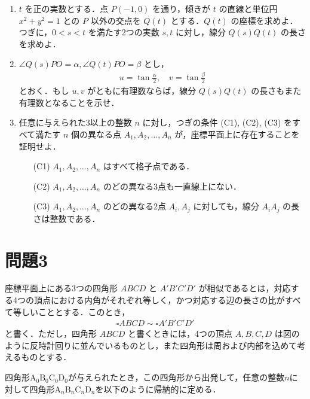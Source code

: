 \documentclass[unicode,12pt, A4j]{ltjsarticle}%
\begin{document}
\begin{enumerate}
 \item $t$ を正の実数とする．点 $P(-1, 0)$ を通り，傾きが $t$ の直線と単位円 $x^2 + y^2 = 1$ との $P$ 以外の交点を $Q(t)$ とする．$Q(t)$ の座標を求めよ．つぎに，$0 < s < t$ を満たす2つの実数 $s, t$ に対し，線分 $Q(s)Q(t)$ の長さを求めよ．
 \item $\angle Q(s)PO = \alpha, \angle Q(t)PO = \beta$ とし，
 \begin{align}
   u = \tan \frac{\alpha}{2}, \quad v = \tan \frac{\beta}{2}   
 \end{align}
とおく．もし $u, v$ がともに有理数ならば，線分 $Q(s)Q(t)$ の長さもまた有理数となることを示せ．
 \item 任意に与えられた3以上の整数 $n$ に対し，つぎの条件 (C1), (C2), (C3) をすべて満たす $n$ 個の異なる点 $A_1, A_2, \dots, A_n$ が，座標平面上に存在することを証明せよ．
\begin{itemize}
    \item[(C1)] $A_1, A_2, \dots, A_n$ はすべて格子点である．
    \item[(C2)] $A_1, A_2, \dots, A_n$ のどの異なる3点も一直線上にない．
    \item[(C3)] $A_1, A_2, \dots, A_n$ のどの異なる2点 $A_i, A_j$ に対しても，線分 $A_iA_j$ の長さは整数である．
\end{itemize}
\end{enumerate}

 

\section{問題3}
座標平面上にある3つの四角形 $ABCD$ と $A'B'C'D'$ が相似であるとは，対応する4つの頂点における内角がそれぞれ等しく，かつ対応する辺の長さの比がすべて等しいこととする．このとき，
\begin{align}
 \square ABCD \sim \square A'B'C'D' 
\end{align}
と書く．ただし，四角形 $ABCD$ と書くときには，4つの頂点 $A, B, C, D$ は図のように反時計回りに並んでいるものとし，また四角形は周および内部を込めて考えるものとする．

四角形$\text{A}_0 \text{B}_0 \text{C}_0 \text{D}_0$が与えられたとき，この四角形から出発して，任意の整数$n$に対して四角形$\text{A}_n \text{B}_n \text{C}_n \text{D}_n$を以下のように帰納的に定める．
\end{document}
